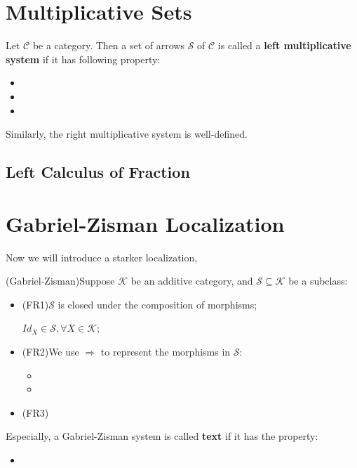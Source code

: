 \documentclass[Total.tex]{subfiles}
\begin{document}
		\section{Multiplicative Sets}
			\begin{Def}
				Let $\mathcal{C}$ be a category. Then a set of arrows $\mathcal{S}$ of $\mathcal{C}$ is called a \textbf{left multiplicative system} if it has following property:
				\begin{itemize}
					\item 
					\item 
					\item 
				\end{itemize}
			\end{Def}
			
			Similarly, the right multiplicative system is well-defined.
			
			\subsection{Left Calculus of Fraction}
		\section{Gabriel-Zisman Localization}
			Now we will introduce a starker localization,
			
			
			\begin{Def}
				(Gabriel-Zisman)Suppose $\mathcal{K}$ be an additive category, and $\mathcal{S}\subseteq \mathcal{K}$ be a subclass:
				\begin{itemize}
					\item (FR1)$\mathcal{S}$ is closed under the composition of morphisms;
					
					$Id_X\in \mathcal{S},\forall X\in \mathcal{K}$;
					\item (FR2)We use $\Rightarrow$ to represent the morphisms in $\mathcal{S}$:
					\begin{itemize}
						\item 
						\item 
					\end{itemize}
					\item (FR3)
				\end{itemize}
			\end{Def}
			
			Especially, a Gabriel-Zisman system is called \textbf{text} if it has the property:
			\begin{itemize}
				\item 
			\end{itemize}
\end{document}
